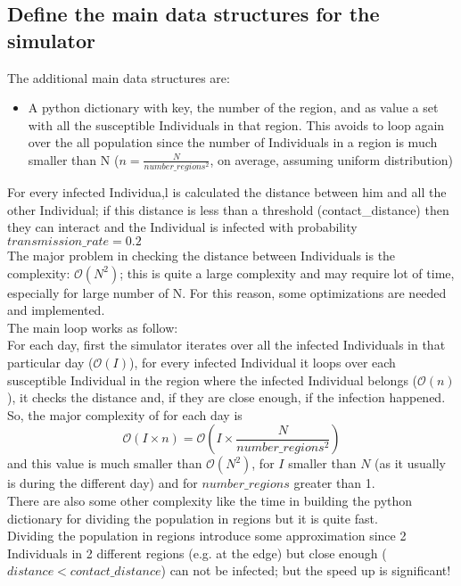 \documentclass[twocolumn,letterpaper]{report}
\begin{document}
{					\subsection{Define the main data structures for the simulator}
						The additional main data structures are: 
							\begin{itemize}
								\item A python dictionary with key, the number of the region, and as value a set with all the susceptible Individuals in that region. This avoids to loop again over the all population since the number of Individuals in a region is much smaller than N ($n=\frac{N}{number\_regions^2}$, on average, assuming uniform distribution)
							\end{itemize}
							For every infected Individua,l is calculated the distance between him and all the other Individual; if this distance is less than a threshold (contact\_distance) then they can interact and the Individual is infected with probability $transmission\_rate=0.2$\\
							The major problem in checking the distance between Individuals is the complexity: $\mathcal{O}(N^2)$; this is quite a large complexity and may require lot of time, especially for large number of N. For this reason, some optimizations are needed and implemented. \\
	The main loop works as follow: \\
	For each day, first the simulator iterates over all the infected Individuals in that particular day ($\mathcal{O}(I)$), for every infected Individual it loops over each susceptible Individual in the region where the infected Individual belongs ($\mathcal{O}(n)$), it checks the distance and, if they are close enough, if the infection happened. So, the major complexity of for each day is 
	\[ \mathcal{O}(I \times n)=\mathcal{O}(I \times \frac{N}{number\_regions^2}) \] and this value is much smaller than $\mathcal{O}(N^2)$, for $I$ smaller than $N$ (as it usually is during the different day) and for $number\_regions$ greater than 1. \\
	 There are also some other complexity like the time in building the python dictionary for dividing the population in regions but it is quite fast.\\
	Dividing the population in regions introduce some approximation since 2 Individuals in 2 different regions (e.g. at the edge) but close enough ($distance<contact\_distance$) can not be infected; but the speed up is significant! \\
	
}
\end{document}
